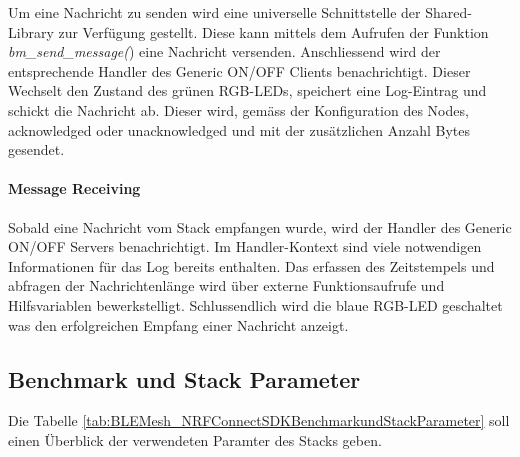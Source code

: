 Um eine Nachricht zu senden wird eine universelle Schnittstelle der Shared-Library zur Verfügung gestellt. Diese kann mittels dem Aufrufen der Funktion \textit{bm\_send\_message(}) eine Nachricht versenden. Anschliessend wird der entsprechende Handler des Generic ON/OFF Clients benachrichtigt. Dieser Wechselt den Zustand des grünen RGB-LEDs, speichert eine Log-Eintrag und schickt die Nachricht ab. Dieser wird, gemäss der Konfiguration des Nodes, acknowledged oder unacknowledged  und mit der zusätzlichen Anzahl Bytes gesendet. 

\paragraph{Message Receiving} 

Sobald eine Nachricht vom Stack empfangen wurde, wird der Handler des Generic ON/OFF Servers benachrichtigt. Im Handler-Kontext sind viele notwendigen Informationen für das Log bereits enthalten. Das erfassen des Zeitstempels und abfragen der Nachrichtenlänge wird über externe Funktionsaufrufe und Hilfsvariablen bewerkstelligt. Schlussendlich wird die blaue RGB-LED geschaltet was den erfolgreichen Empfang einer Nachricht anzeigt. 


\subsection{Benchmark und Stack Parameter}\label{subsec:BT_MESHBenchmarkundStackParameter}

Die Tabelle \ref{tab:BLEMesh_NRFConnectSDKBenchmarkundStackParameter} soll einen Überblick der verwendeten Paramter des Stacks geben. 

